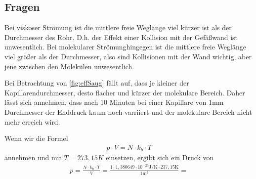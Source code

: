 \documentclass[11pt, a4paper]{article}
\begin{document}
    \subsection{Fragen}
    Bei viskoser Strömung ist die mittlere freie Weglänge viel kürzer ist als der Durchmesser des Rohr. D.h. der Effekt einer Kollision mit der Gefäßwand ist unwesentlich. Bei molekularer Strömunghingegen ist die mittlere freie Weglänge viel größer als der Durchmesser, also sind Kollisionen mit der Wand wichtig, aber jene zwischen den Molekülen unwesentlich.

    Bei Betrachtung von \ref*{fig:effSaug} fällt auf, dass je kleiner der Kapillarendurchmesser, desto flacher und kürzer der molekulare Bereich.
    Daher lässt sich annehmen, dass nach 10 Minuten bei einer Kapillare von 1mm Durchmesser der Enddruck kaum noch varriiert und der molekulare Bereich nicht mehr erreich wird.



    Wenn wir die Formel
    \begin{align}
        p \cdot V = N \cdot k_b \cdot T
    \end{align}
    annehmen und mit $T = 273,15K$ einsetzen, ergibt sich ein Druck von
    \begin{align}
        p = \frac{N \cdot k_b \cdot T}{V} = \frac{1 \cdot 1,380649 \cdot 10^{-23} \si{\joule\per\kelvin} \cdot 237,15 \si{\kelvin}}{1 \si{\meter\cubed}} = 
    \end{align}

    
    
\end{document}

